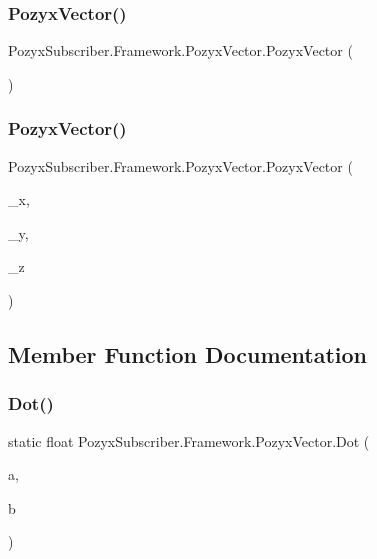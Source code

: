 \subsubsection{\texorpdfstring{Pozyx\+Vector()}{PozyxVector()}\hspace{0.1cm}{\footnotesize\ttfamily [1/2]}}
{\footnotesize\ttfamily Pozyx\+Subscriber.\+Framework.\+Pozyx\+Vector.\+Pozyx\+Vector (\begin{DoxyParamCaption}{ }\end{DoxyParamCaption})}

\mbox{\label{struct_pozyx_subscriber_1_1_framework_1_1_pozyx_vector_ab572bd4a48efe90311b899b86f73fadf}} 
\subsubsection{\texorpdfstring{Pozyx\+Vector()}{PozyxVector()}\hspace{0.1cm}{\footnotesize\ttfamily [2/2]}}
{\footnotesize\ttfamily Pozyx\+Subscriber.\+Framework.\+Pozyx\+Vector.\+Pozyx\+Vector (\begin{DoxyParamCaption}\item[{float}]{\+\_\+x,  }\item[{float}]{\+\_\+y,  }\item[{float}]{\+\_\+z }\end{DoxyParamCaption})}



\subsection{Member Function Documentation}
\mbox{\label{struct_pozyx_subscriber_1_1_framework_1_1_pozyx_vector_abc07da4b47b1141e447f0a6a57fbb5fb}} 
\subsubsection{\texorpdfstring{Dot()}{Dot()}}
{\footnotesize\ttfamily static float Pozyx\+Subscriber.\+Framework.\+Pozyx\+Vector.\+Dot (\begin{DoxyParamCaption}\item[{\hyperlink{struct_pozyx_subscriber_1_1_framework_1_1_pozyx_vector}{Pozyx\+Vector}}]{a,  }\item[{\hyperlink{struct_pozyx_subscriber_1_1_framework_1_1_pozyx_vector}{Pozyx\+Vector}}]{b }\end{DoxyParamCaption})\hspace{0.3cm}{\ttfamily [static]}}

